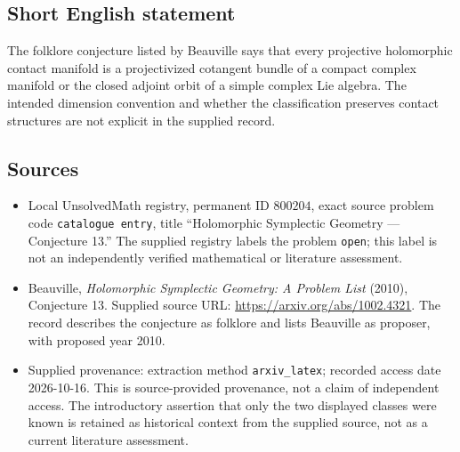 \documentclass[11pt]{article}
\begin{document}
\subsection{Short English statement}
The folklore conjecture listed by Beauville says that every projective holomorphic contact manifold is a projectivized cotangent bundle of a compact complex manifold or the closed adjoint orbit of a simple complex Lie algebra. The intended dimension convention and whether the classification preserves contact structures are not explicit in the supplied record.
\subsection{Sources}
\begin{itemize}
\item Local UnsolvedMath registry, permanent ID \(800204\), exact source problem code \texttt{catalogue entry}, title ``Holomorphic Symplectic Geometry --- Conjecture 13.'' The supplied registry labels the problem \texttt{open}; this label is not an independently verified mathematical or literature assessment.
\item Beauville, \emph{Holomorphic Symplectic Geometry: A Problem List} (2010), Conjecture 13. Supplied source URL: \url{https://arxiv.org/abs/1002.4321}. The record describes the conjecture as folklore and lists Beauville as proposer, with proposed year 2010.
\item Supplied provenance: extraction method \texttt{arxiv\_latex}; recorded access date 2026-10-16. This is source-provided provenance, not a claim of independent access. The introductory assertion that only the two displayed classes were known is retained as historical context from the supplied source, not as a current literature assessment.
\end{itemize}
\end{document}
